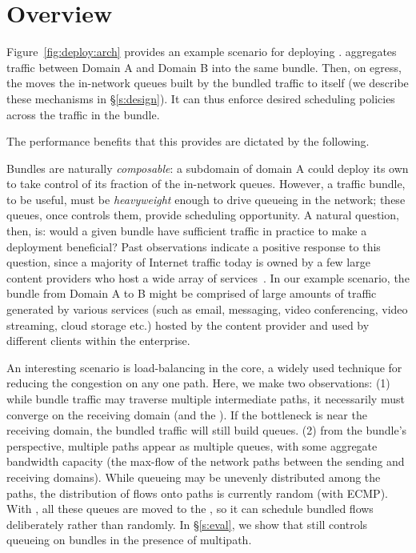 \section{Overview}
\label{s:deploy}

Figure~\ref{fig:deploy:arch} provides an example scenario for deploying \name. 
\name aggregates traffic between Domain A and Domain B into the same bundle. 
Then, on egress, the \inbox moves the in-network queues built by the bundled traffic to itself (we describe these mechanisms in \S\ref{s:design}). 
It can thus enforce desired scheduling policies across the traffic in the bundle.

The performance benefits that this provides are dictated by the following.

Bundles are naturally \emph{composable}: a subdomain of domain A could deploy its own \name to take control of its fraction of the in-network queues.
However, a traffic bundle, to be useful, must be \emph{heavyweight} enough to drive queueing in the network; these queues, once \name controls them, provide scheduling opportunity.
A natural question, then, is: would a given bundle have sufficient traffic in practice to make a \name deployment beneficial? 
Past observations indicate a positive response to this question, since a majority of Internet traffic today is owned by a few large content providers who host a wide array of services~\cite{fivecomps, labovitz}. 
In our example scenario, the bundle from Domain A to B might be comprised of large amounts of traffic generated by various services (such as email, messaging, video conferencing, video streaming, cloud storage etc.) hosted by the content provider and used by different clients within the enterprise.

An interesting scenario is load-balancing in the core, a widely used technique for reducing the congestion on any one path.
Here, we make two observations: 
(1) while bundle traffic may traverse multiple intermediate paths, it necessarily must converge on the receiving domain (and the \outbox). If the bottleneck is near the receiving domain, the bundled traffic will still build queues.
(2) from the bundle's perspective, multiple paths appear as multiple queues, with some aggregate bandwidth capacity (\ie the max-flow of the network paths between the sending and receiving domains). While queueing may be unevenly distributed among the paths, the distribution of flows onto paths is currently random (\eg with ECMP). With \name, all these queues are moved to the \inbox, so it can schedule bundled flows deliberately rather than randomly.
In \S\ref{s:eval}, we show that \name still controls queueing on bundles in the presence of multipath.

